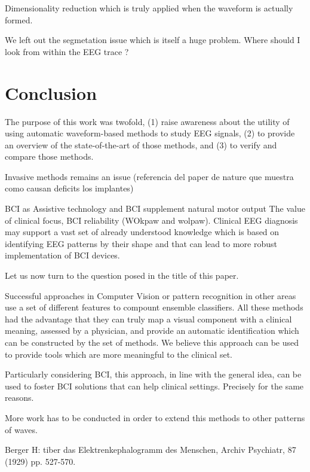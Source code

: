\documentclass[sensors,article,submit,moreauthors,pdftex,10pt,a4paper]{mdpi}
\begin{document}
Dimensionality reduction which is truly applied when the waveform is actually formed.

We left out the segmetation issue which is itself a huge problem.  Where should I look from within the EEG trace ?

\section{Conclusion}

The purpose of this work was twofold, (1) raise awareness about the utility of using automatic waveform-based methods to study EEG signals, (2) to provide an overview of the state-of-the-art of those methods, and (3) to verify and compare those methods.

Invasive methods remains an issue (referencia del paper de nature que muestra como causan deficits los implantes)


BCI as Assistive technology and BCI supplement natural motor output
The value of clinical focus, 
BCI reliability (WOkpaw and wolpaw).  Clinical EEG diagnosis may support a vast set of already understood knowledge which is based on identifying EEG patterns by their shape and that can lead to more robust implementation of BCI devices.

Let us now turn to the question posed in the title of this paper.

Successful approaches in Computer Vision or pattern recognition in other areas use a set of different features to compount ensemble classifiers.  All these methods had the advantage 
that they can truly map a visual component with a clinical meaning, assessed by a physician, and provide an automatic identification which can be constructed by the set of methods.  We believe this approach can be used to provide tools which are more meaningful to the clinical set.

Particularly considering BCI, this approach, in line with the general idea, can be used to foster BCI solutions that can help clinical settings.  Precisely for the same reasons.

More work has to be conducted in order to extend this methods to other patterns of waves.  

Berger H: tiber das Elektrenkephalogramm des Menschen, Archiv Psychiatr, 87 (1929) pp. 527-570.
\end{document}
